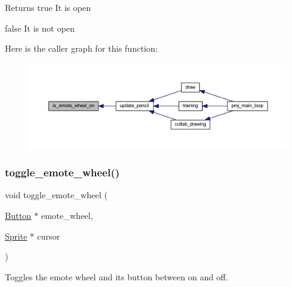 \begin{DoxyReturn}{Returns}
true It is open 

false It is not open 
\end{DoxyReturn}
Here is the caller graph for this function\+:\nopagebreak
\begin{figure}[H]
\begin{center}
\leavevmode
\includegraphics[width=350pt]{group__emote_gac9359f9dfee500c297df48a9cdb2fb11_icgraph}
\end{center}
\end{figure}
\mbox{\label{group__emote_gab67bd820d159dbce1349586c05aeac11}} 
\subsubsection{\texorpdfstring{toggle\+\_\+emote\+\_\+wheel()}{toggle\_emote\_wheel()}}
{\footnotesize\ttfamily void toggle\+\_\+emote\+\_\+wheel (\begin{DoxyParamCaption}\item[{\mbox{\hyperlink{struct_button}{Button}} $\ast$}]{emote\+\_\+wheel,  }\item[{\mbox{\hyperlink{struct_sprite}{Sprite}} $\ast$}]{cursor }\end{DoxyParamCaption})}



Toggles the emote wheel and its button between on and off. 


